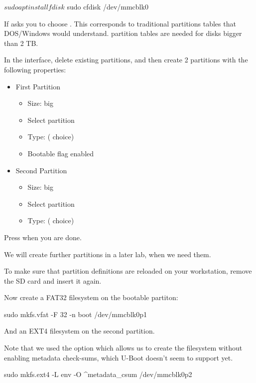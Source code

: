 \begin{bashinput}
$ sudo apt install fdisk
$ sudo cfdisk /dev/mmcblk0
\end{bashinput}


If  asks you to  choose .
This corresponds to traditional partitions tables that DOS/Windows would 
understand.  partition tables are needed for disks bigger than 2 TB.

In the  interface, delete existing partitions, and then create 2
partitions with the following properties:

\begin{itemize}
\item First Partition
\begin{itemize}
  \item Size:  big
  \item Select  partition
  \item Type:   ( choice)
  \item Bootable flag enabled
\end{itemize}

\item Second Partition
\begin{itemize}
  \item Size:  big
  \item Select  partition
  \item Type:   ( choice)
\end{itemize}
\end{itemize}

Press  when you are done.

We will create further partitions in a later lab, when we need them.

To make sure that partition definitions are reloaded on your
workstation, remove the SD card and insert it again.

Now create a FAT32 filesystem on the bootable partiton:
\begin{bashinput}
sudo mkfs.vfat -F 32 -n boot /dev/mmcblk0p1
\end{bashinput}

And an EXT4 filesystem on the second partition.

Note that we used the  option which allows us to create
the filesystem without enabling metadata check-sums, which U-Boot doesn't
seem to support yet.
\begin{bashinput}
sudo mkfs.ext4 -L env -O ^metadata_csum /dev/mmcblk0p2
\end{bashinput}

